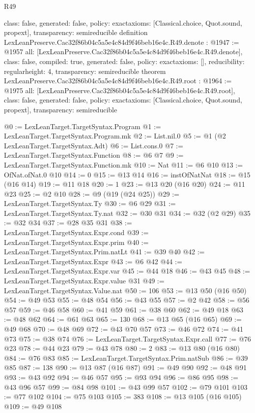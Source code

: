 \begin{lexlean}{R49}
\begin{coremodule}
{  class: false,
  generated: false,
  policy: exact{axioms: [Classical.choice, Quot.sound, propext]},
  transparency: semireducible
}
definition LexLeanPreserve.Cac32f86b04c5a5e4c84d9f46beb16e4c.R49.denote : @1947 := @1957 {
  all: [LexLeanPreserve.Cac32f86b04c5a5e4c84d9f46beb16e4c.R49.denote],
  class: false,
  compiled: true,
  generated: false,
  policy: exact{axioms: []},
  reducibility: regular{height: 4},
  transparency: semireducible
}
theorem LexLeanPreserve.Cac32f86b04c5a5e4c84d9f46beb16e4c.R49.root : @1964 := @1975 {
  all: [LexLeanPreserve.Cac32f86b04c5a5e4c84d9f46beb16e4c.R49.root],
  class: false,
  generated: false,
  policy: exact{axioms: [Classical.choice, Quot.sound, propext]},
  transparency: semireducible
}

@0 := LexLeanTarget.TargetSyntax.Program
@1 := LexLeanTarget.TargetSyntax.Program.mk
@2 := List.nil.{0}
@5 := @1 (@2 LexLeanTarget.TargetSyntax.Adt)
@6 := List.cons.{0}
@7 := LexLeanTarget.TargetSyntax.Function
@8 := @6 @7
@9 := LexLeanTarget.TargetSyntax.Function.mk
@10 := Nat
@11 := @6 @10
@13 := OfNat.ofNat.{0} @10
@14 := 0
@15 := @13 @14
@16 := instOfNatNat
@18 := @15 (@16 @14)
@19 := @11 @18
@20 := 1
@23 := @13 @20 (@16 @20)
@24 := @11 @23
@25 := @2 @10
@28 := @9 (@19 (@24 @25))
@29 := LexLeanTarget.TargetSyntax.Ty
@30 := @6 @29
@31 := LexLeanTarget.TargetSyntax.Ty.nat
@32 := @30 @31
@34 := @32 (@2 @29)
@35 := @32 @34
@37 := @28 @35 @31
@38 := LexLeanTarget.TargetSyntax.Expr.cond
@39 := LexLeanTarget.TargetSyntax.Expr.prim
@40 := LexLeanTarget.TargetSyntax.Prim.natLt
@41 := @39 @40
@42 := LexLeanTarget.TargetSyntax.Expr
@43 := @6 @42
@44 := LexLeanTarget.TargetSyntax.Expr.var
@45 := @44 @18
@46 := @43 @45
@48 := LexLeanTarget.TargetSyntax.Expr.value @31
@49 := LexLeanTarget.TargetSyntax.Value.nat
@50 := 106
@53 := @13 @50 (@16 @50)
@54 := @49 @53
@55 := @48 @54
@56 := @43 @55
@57 := @2 @42
@58 := @56 @57
@59 := @46 @58
@60 := @41 @59
@61 := @38 @60
@62 := @49 @18
@63 := @48 @62
@64 := @61 @63
@65 := 130
@68 := @13 @65 (@16 @65)
@69 := @49 @68
@70 := @48 @69
@72 := @43 @70 @57
@73 := @46 @72
@74 := @41 @73
@75 := @38 @74
@76 := LexLeanTarget.TargetSyntax.Expr.call
@77 := @76 @23
@78 := @44 @23
@79 := @43 @78
@80 := 2
@83 := @13 @80 (@16 @80)
@84 := @76 @83
@85 := LexLeanTarget.TargetSyntax.Prim.natSub
@86 := @39 @85
@87 := 138
@90 := @13 @87 (@16 @87)
@91 := @49 @90
@92 := @48 @91
@93 := @43 @92
@94 := @46 @57
@95 := @93 @94
@96 := @86 @95
@98 := @43 @96 @57
@99 := @84 @98
@101 := @43 @99 @57
@102 := @79 @101
@103 := @77 @102
@104 := @75 @103
@105 := 383
@108 := @13 @105 (@16 @105)
@109 := @49 @108

\end{coremodule}
\end{lexlean}
